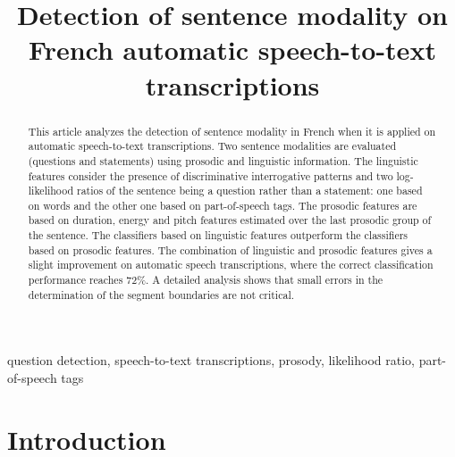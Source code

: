 \documentclass[conference]{IEEEtran}
\begin{document}
\title{Detection of sentence modality on\\French automatic speech-to-text transcriptions}

\author{
}


\maketitle


\begin{abstract}
This article analyzes the detection of sentence modality in French when it is applied on automatic speech-to-text transcriptions. 
Two sentence modalities are evaluated (questions and statements) using prosodic and linguistic information. 
The linguistic features consider the presence of discriminative interrogative patterns and two log-likelihood ratios of the sentence being a question rather than a statement: one based on words and the other one based on part-of-speech tags. 
The prosodic features are based on duration, energy and pitch features estimated over the last prosodic group of the sentence. 
The classifiers based on linguistic features outperform the classifiers based on prosodic features. 
The combination of linguistic and prosodic features gives a slight improvement on automatic speech transcriptions, where the correct classification performance reaches 72\%. 
A detailed analysis shows that small errors in the determination of the segment boundaries are not critical.
\end{abstract}
\begin{IEEEkeywords}
question detection, speech-to-text transcriptions, prosody, likelihood ratio, part-of-speech tags
\end{IEEEkeywords}


\section{Introduction}
\end{document}
